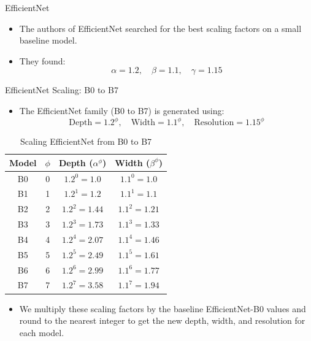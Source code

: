 \begin{frame}[allowframebreaks]{EfficientNet}
\framebreak

    \begin{itemize}
        \item The authors of EfficientNet searched for the best scaling factors on a small baseline model.
        \item They found:
        \[
        \alpha = 1.2, \quad \beta = 1.1, \quad \gamma = 1.15
        \]
    \end{itemize}
\end{frame}

\begin{frame}{EfficientNet Scaling: B0 to B7}
    \begin{itemize}
        \item The EfficientNet family (B0 to B7) is generated using:
        \[
        \text{Depth} = 1.2^\phi, \quad
        \text{Width} = 1.1^\phi, \quad
        \text{Resolution} = 1.15^\phi
        \]
    \end{itemize}

    \begin{table}[]
        \centering
        \begin{tabular}{|c|c|c|c|}
            \hline
            \textbf{Model} & \(\phi\) & \textbf{Depth} (\(\alpha^\phi\)) & \textbf{Width} (\(\beta^\phi\)) \\ 
            \hline
            B0 & 0 & \(1.2^0 = 1.0\) & \(1.1^0 = 1.0\)  \\ 
            B1 & 1 & \(1.2^1 = 1.2\) & \(1.1^1 = 1.1\)  \\ 
            B2 & 2 & \(1.2^2 = 1.44\) & \(1.1^2 = 1.21\)  \\ 
            B3 & 3 & \(1.2^3 = 1.73\) & \(1.1^3 = 1.33\)  \\ 
            B4 & 4 & \(1.2^4 = 2.07\) & \(1.1^4 = 1.46\)  \\ 
            B5 & 5 & \(1.2^5 = 2.49\) & \(1.1^5 = 1.61\)  \\ 
            B6 & 6 & \(1.2^6 = 2.99\) & \(1.1^6 = 1.77\)  \\ 
            B7 & 7 & \(1.2^7 = 3.58\) & \(1.1^7 = 1.94\)  \\ 
            \hline
        \end{tabular}
        \caption*{Scaling EfficientNet from B0 to B7}
    \end{table}

    \begin{itemize}
        \item We multiply these scaling factors by the baseline EfficientNet-B0 values and round to the nearest integer to get the new depth, width, and resolution for each model.
    \end{itemize}
\end{frame}


